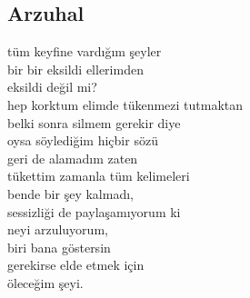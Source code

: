 \subsection{Arzuhal}

tüm keyfine vardığım şeyler \\
bir bir eksildi ellerimden \\
eksildi değil mi? \\

\noindent\newline
hep korktum elimde tükenmezi tutmaktan \\
belki sonra silmem gerekir diye \\
oysa söylediğim hiçbir sözü \\
geri de alamadım zaten \\
tükettim zamanla tüm kelimeleri \\
bende bir şey kalmadı, \\
sessizliği de paylaşamıyorum ki \\
neyi arzuluyorum, \\
	biri bana göstersin \\
		gerekirse elde etmek için \\
			öleceğim şeyi. \\